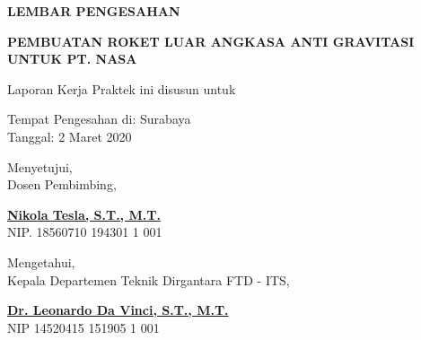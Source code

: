 \begin{center}
  {\Large \textbf{LEMBAR PENGESAHAN}}
  \vspace{6ex}


  {\large \textbf{PEMBUATAN ROKET LUAR ANGKASA ANTI GRAVITASI UNTUK PT. NASA}}
  \vspace{6ex}

  Laporan Kerja Praktek ini disusun untuk \lipsum[1][1]
  \vspace{2ex}

  Tempat Pengesahan di: Surabaya \\
  Tanggal: 2 Maret 2020
  \vspace{8ex}

  Menyetujui, \\
  Dosen Pembimbing,
  \vspace{12ex}

  \textbf{\underline{Nikola Tesla, S.T., M.T.}} \\
  NIP. 18560710 194301 1 001
  \vspace{8ex}

  Mengetahui, \\
  Kepala Departemen Teknik Dirgantara FTD - ITS,
  \vspace{12ex}

  \textbf{\underline{Dr. Leonardo Da Vinci, S.T., M.T.}} \\
  NIP 14520415 151905 1 001

\end{center}